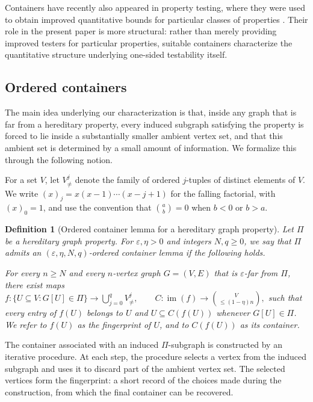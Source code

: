 \documentclass[11pt,reqno,letterpaper]{amsart}
\theoremstyle{plain}
\newtheorem{defn}[thm]{Definition}
\theoremstyle{remark}
\begin{document}
Containers have recently also appeared in property testing, where they were used to obtain improved quantitative bounds for particular classes of properties \cite{blais2024new,blais2025testing,seth2025tolerant, grigorescu2026testing}. Their role in the present paper is more structural: rather than merely providing improved testers for particular properties, suitable containers characterize the quantitative structure underlying one-sided testability itself.

\subsection{Ordered containers}

The main idea underlying our characterization is that, inside any graph that is far from a hereditary property, every induced subgraph satisfying the property is forced to lie inside a substantially smaller ambient vertex set, and that this ambient set is determined by a small amount of information. We formalize this through the following notion.

For a set $V$, let $V_{\neq}^{j}$ denote the family of ordered $j$-tuples of distinct elements of $V$.  We write
$(x)_j=x(x-1)\cdots(x-j+1)$ for the falling factorial, with $(x)_0=1$, and use the convention that $\binom ab=0$ when $b<0$ or $b>a$.

\begin{defn}[Ordered container lemma for a hereditary graph property]
\label{def:ordered-container-graph}
Let $\Pi$ be a hereditary graph property. For $\varepsilon,\eta>0$ and integers $N,q\geq0$, we say that $\Pi$ admits an
$(\varepsilon,\eta,N,q)$-\textit{ordered container lemma} if the following holds.

For every $n\geq N$ and every $n$-vertex graph $G=(V,E)$ that is $\varepsilon$-far from $\Pi$, there exist maps
\(f:\{U\subseteq V:G[U]\in\Pi\}\longrightarrow \bigcup_{j=0}^{q}V_{\neq}^{j}, \qquad C:\operatorname{im}(f)\longrightarrow \binom{V}{\leq(1-\eta)n},\)
such that every entry of $f(U)$ belongs to $U$ and $U\subseteq C(f(U))$ whenever $G[U]\in\Pi$. We refer to $f(U)$ as the \textit{fingerprint} of $U$, and to $C(f(U))$ as its \textit{container}.
\end{defn}

The container associated with an induced $\Pi$-subgraph is constructed by an iterative procedure. At each step, the procedure selects a vertex from the induced subgraph and uses it to discard part of the ambient vertex set. The selected vertices form the fingerprint: a short record of the choices made during the construction, from which the final container can be recovered.
\end{document}
